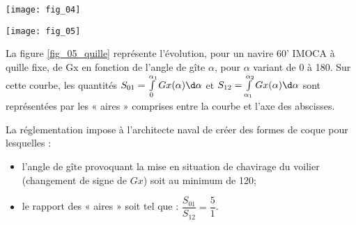 %
%

\vspace{.5cm}

\begin{minipage}[b]{.47\linewidth}
\begin{center}
\texttt{[image: fig\_04]}
\end{center}
\end{minipage}\hfill
\begin{minipage}[b]{.47\linewidth}
\begin{center}
\texttt{[image: fig\_05]}
\end{center}
 \end{minipage}
 

La figure \ref{fig_05_quille} représente l’évolution, pour un navire 60’ IMOCA à quille fixe, de Gx en fonction de l’angle de gîte $\alpha$, pour $\alpha$ variant de 0 à 180\degres. Sur cette courbe, les quantités 
$S_{01}=\int\limits_{0}^{\alpha_1} Gx(\alpha) \d \alpha$ et 
$S_{12}=\int\limits_{\alpha_1}^{\alpha_2} Gx(\alpha) \d \alpha$  
 sont représentées par les « aires » comprises entre la courbe et l’axe des abscisses.
 
La réglementation impose à l’architecte naval de créer des formes de coque pour lesquelles :
\begin{itemize}
\item l’angle de gîte provoquant la mise en situation de chavirage du voilier (changement de signe de $Gx$) soit au minimum de 120\degres;
\item le rapport des « aires » soit tel que : $\dfrac{S_{01}}{S_{12}}=\dfrac{5}{1}$.
\end{itemize}

